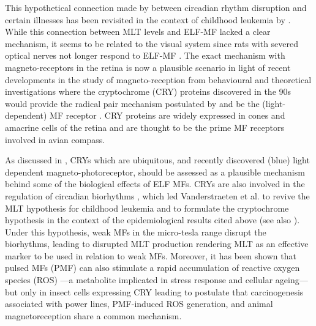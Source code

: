 \documentclass[letter,twoside]{article}
\begin{document}
 This hypothetical connection made by \citet{Stevens1996} between    circadian rhythm disruption and certain illnesses 
has been revisited in the context of childhood leukemia by \citet{Henshaw2005}. 
While this connection between MLT levels and ELF-MF lacked a clear mechanism, it seems to be related to the visual system since rats
with severed optical nerves not longer respond to ELF-MF \citep{Olcese1985}. The exact mechanism with magneto-receptors in the retina is now
a plausible scenario in light of recent developments in the study of magneto-reception from behavioural 
\citep[e.g.][]{Bazalova2016,Gegear2008,Johnsen2005,kirschvink1991,Phillips1992,Ritz2004,Ritz2009, Malkemper2015,Sherrard2018,Wiltschko2005,Winklhofer2013,Wiltschko2014,Wiltschko2016,Yoshii2009}
and  theoretical investigations \citep[e.g.][]{Hore2016,Ritz2010}
where the cryptochrome (CRY) proteins discovered in the 90s  \citep{Ahmad1993,Ahmad2007,Ahmad1999,Ahmad2016,Chasmore1999,Chaves2011} would provide the radical pair mechanism postulated by \citet{Schulten1978} and
be the (light-dependent) MF receptor 
 \citep{Hore2016,Liedvogel2010,Michael2017,Ritz2010b}.   
 CRY proteins are widely expressed in cones and amacrine cells of the retina \citep[e.g.][]{Foley2011,Wong2018} and are thought to be the prime MF receptors  involved in avian compass.
 
 As discussed in \citet{Lagroye2011}, CRYs which are ubiquitous, and   recently discovered (blue) light dependent magneto-photoreceptor,  should be assessed as a plausible mechanism behind some of the biological effects of ELF MFs.
 CRYs are also involved in the regulation of circadian biorhythms  \citep[e.g.][]{vanderHorst1999,Yoshii2009,Ono2013,Wong2018}, which led Vanderstraeten et al. 
 \citep{Vanderstraeten2012,Vanderstraeten2012a,Vanderstraeten2015,Vanderstraeten2017} to revive the MLT hypothesis for childhood leukemia
 and to formulate the cryptochrome hypothesis   in the context of the epidemiological results cited above (see also \citet{Lagroye2011,Juutilainen2018}). Under this hypothesis,
weak MFs in the micro-tesla range disrupt the biorhythms, leading to disrupted MLT production rendering MLT as an effective marker  to be used in relation to weak MFs.  Moreover, it has been shown that pulsed MFs (PMF) can also stimulate a rapid accumulation of reactive oxygen species (ROS) ---a  metabolite implicated in stress response and cellular ageing--- but  only in insect cells expressing CRY \citep{Sherrard2018} leading \citet{Landler2018} to postulate that  carcinogenesis associated with power lines, PMF-induced ROS generation, and animal magnetoreception share a common mechanism.
\end{document}
